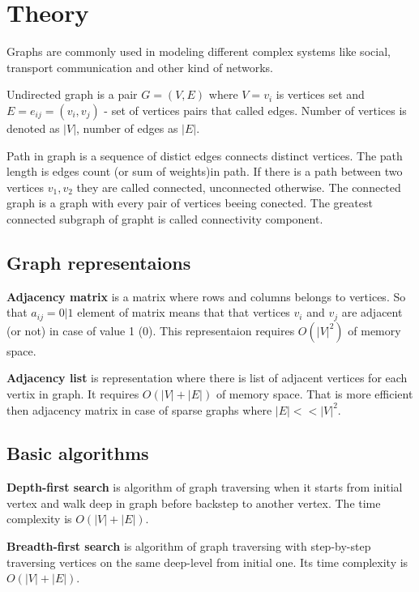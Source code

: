 \section*{Theory}

Graphs are commonly used in modeling different complex systems like social, transport communication and other kind of networks.

Undirected graph is a pair $G = (V, E)$ where $V = {v_i}$ is vertices set and $E = {e_{ij}} = {(v_i, v_j)}$ - set of vertices pairs that called edges.
Number of vertices is denoted as $|V|$, number of edges as $|E|$.

Path in graph is a sequence of distict edges connects distinct vertices. The path length is edges count (or sum of weights)in path.
If there is a path between two vertices $v_1, v_2$ they are called connected, unconnected otherwise. The connected graph is a graph with every pair of vertices beeing conected.
The greatest connected subgraph of grapht is called connectivity component.

\subsection*{Graph representaions}

\textbf{Adjacency matrix} is a matrix where rows and columns belongs to vertices. So that $a_{ij} = 0|1$ element of matrix means that
that vertices $v_i$ and $v_j$ are adjacent (or not) in case of value 1 (0). This representaion requires $O(|V|^2)$ of memory space.

\textbf{Adjacency list} is representation where there is list of adjacent vertices for each vertix in graph. It requires $O(|V| + |E|)$ of memory space. That is more efficient then adjacency matrix in case of sparse graphs where $|E| << |V|^2$.

\subsection*{Basic algorithms}

\textbf{Depth-first search} is algorithm of graph traversing when it starts from initial vertex and walk deep in graph before backstep to another vertex. The time complexity is $O(|V| + |E|)$.

\textbf{Breadth-first search} is algorithm of graph traversing with step-by-step traversing vertices on the same deep-level from initial one. Its time complexity is $O(|V| + |E|)$.